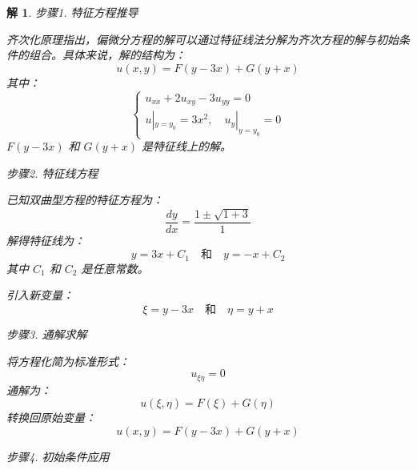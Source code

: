 \documentclass[12pt,a4paper]{article}
\newtheorem*{solution}{解}
\begin{document}
\begin{solution}
	步骤1. 特征方程推导
	
		\noindent
	齐次化原理指出，偏微分方程的解可以通过特征线法分解为齐次方程的解与初始条件的组合。具体来说，解的结构为：
	\[
	u(x, y) = F(y - 3x) + G(y + x)
	\]
	其中：
	\begin{equation}\label{eq:4}
		\begin{cases}
			u_{xx} + 2u_{xy} - 3u_{yy} = 0 \\
			u|_{y=y_0} = 3x^2, \quad u_y|_{y=y_0} = 0
		\end{cases}
	\end{equation}
	\( F(y - 3x) \) 和 \( G(y + x) \) 是特征线上的解。
	
	步骤2. 特征线方程
	
		\noindent
	已知双曲型方程的特征方程为：
	\[
	\frac{dy}{dx} = \frac{1 \pm \sqrt{1 + 3}}{1}
	\]
	解得特征线为：
	\[
	y = 3x + C_1 \quad \text{和} \quad y = -x + C_2
	\]
	其中 \( C_1 \) 和 \( C_2 \) 是任意常数。
	
	引入新变量：
	\[
	\xi = y - 3x \quad \text{和} \quad \eta = y + x
	\]
	
	步骤3. 通解求解
	
		\noindent
	将方程化简为标准形式：
	\[
	u_{\xi\eta} = 0
	\]
	通解为：
	\[
	u(\xi, \eta) = F(\xi) + G(\eta)
	\]
	转换回原始变量：
	\[
	u(x, y) = F(y - 3x) + G(y + x)
	\]
	
步骤4. 初始条件应用
	

\end{solution}
\end{document}
